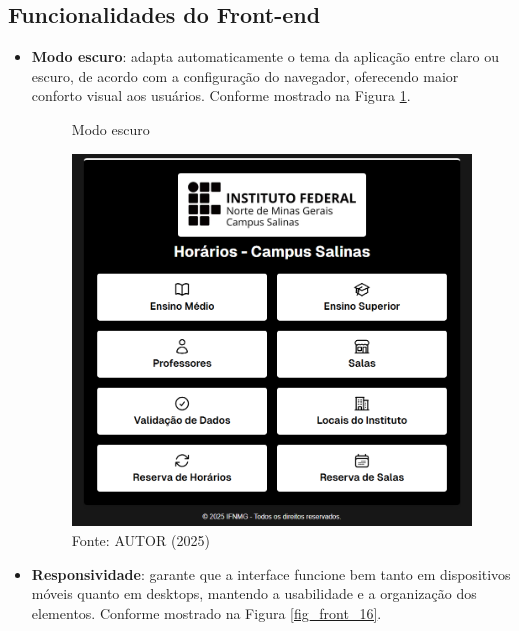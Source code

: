 \subsection{Funcionalidades do Front-end}

\begin{itemize}
    \item \textbf{Modo escuro}: adapta automaticamente o tema da aplicação entre claro ou escuro, de acordo com a configuração do navegador, oferecendo maior conforto visual aos usuários. Conforme mostrado na Figura \ref{fig_front_15}.

    \begin{figure}[htb]
        \centering
        \caption{Modo escuro}
        \includegraphics[width=1\textwidth]{Figuras/front-15.png}
        \caption*{Fonte: AUTOR (2025)}
        \label{fig_front_15}
    \end{figure}

    \item \textbf{Responsividade}: garante que a interface funcione bem tanto em dispositivos móveis quanto em desktops, mantendo a usabilidade e a organização dos elementos. Conforme mostrado na Figura \ref{fig_front_16}.


\end{itemize}
